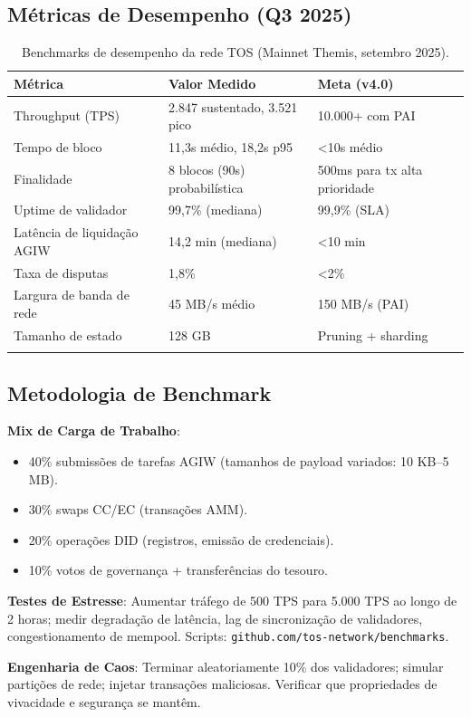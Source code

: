\documentclass[11pt]{article}
\begin{document}
\begin{itemize}[noitemsep]
\begin{itemize}[noitemsep]
\begin{itemize}[noitemsep]
\subsection{Métricas de Desempenho (Q3 2025)}

\begin{longtable}{@{}p{}p{}p{}@{}}
\toprule
\textbf{Métrica} & \textbf{Valor Medido} & \textbf{Meta (v4.0)} \\\midrule
Throughput (TPS) & 2.847 sustentado, 3.521 pico & 10.000+ com PAI \\
Tempo de bloco & 11,3s médio, 18,2s p95 & <10s médio \\
Finalidade & 8 blocos (90s) probabilística & 500ms para tx alta prioridade \\
Uptime de validador & 99,7\% (mediana) & 99,9\% (SLA) \\
Latência de liquidação AGIW & 14,2 min (mediana) & <10 min \\
Taxa de disputas & 1,8\% & <2\% \\
Largura de banda de rede & 45 MB/s médio & 150 MB/s (PAI) \\
Tamanho de estado & 128 GB & Pruning + sharding \\
\bottomrule
\caption{Benchmarks de desempenho da rede TOS (Mainnet Themis, setembro 2025).}
\end{longtable}

\subsection{Metodologia de Benchmark}

\textbf{Mix de Carga de Trabalho}:
\begin{itemize}[noitemsep]
  \item 40\% submissões de tarefas AGIW (tamanhos de payload variados: 10 KB--5 MB).
  \item 30\% swaps CC/EC (transações AMM).
  \item 20\% operações DID (registros, emissão de credenciais).
  \item 10\% votos de governança + transferências do tesouro.
\end{itemize}

\textbf{Testes de Estresse}: Aumentar tráfego de 500 TPS para 5.000 TPS ao longo de 2 horas; medir degradação de latência, lag de sincronização de validadores, congestionamento de mempool. Scripts: \texttt{github.com/tos-network/benchmarks}.

\textbf{Engenharia de Caos}: Terminar aleatoriamente 10\% dos validadores; simular partições de rede; injetar transações maliciosas. Verificar que propriedades de vivacidade e segurança se mantêm.


\end{itemize}
\end{itemize}
\end{itemize}
\end{document}
